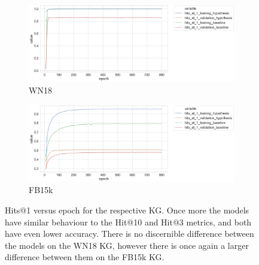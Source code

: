 
\begin{figure}[H]
	\begin{subfigure}[b]{.5\linewidth}
   		\centering
    		\includegraphics[width=1.0\linewidth, height=0.6\linewidth]{WN18_hits_at_1_Results}
		\captionsetup{justification=centering}
		\caption{WN18}
	\end{subfigure}
	\begin{subfigure}[b]{.5\linewidth}
   		\centering
		\includegraphics[width=1.0\linewidth, height=0.6\linewidth]{FB15k_hits_at_1_Results}
		\captionsetup{justification=centering}
		\caption{FB15k}
	\end{subfigure}
	\captionsetup{justification=centering}
	\caption{Hits@1 versus epoch for the respective KG. Once more the models have similar behaviour to the Hit@10 and Hit@3 metrics, and both have even lower accuracy. There is no discernible difference between the models on the WN18 KG, however there is once again a larger difference between them on the FB15k KG. }
\end{figure}

